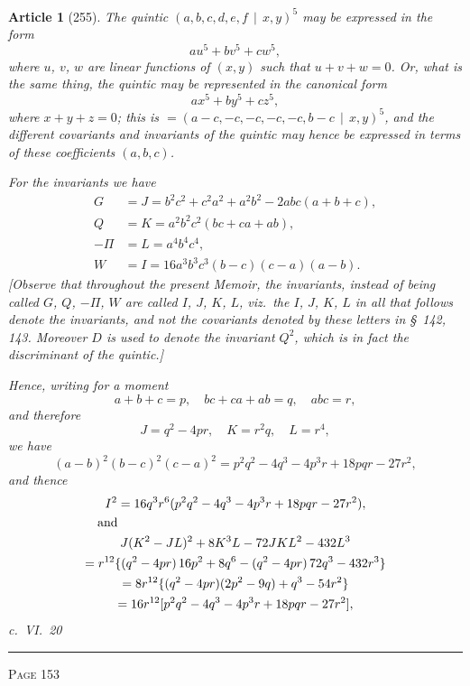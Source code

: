 \documentclass[11pt,a4paper]{article}
\theoremstyle{cayley}
\newtheorem{art}{Article}
\begin{document}
\begin{art}[255]
The quintic $(a, b, c, d, e, f \,\mid\, x, y)^5$ may be expressed in the form
\[
au^5 + bv^5 + cw^5,
\]
where $u$, $v$, $w$ are linear functions of $(x, y)$ such that $u + v + w = 0$. Or, what is the same thing, the quintic may be represented in the canonical form
\[
ax^5 + by^5 + cz^5,
\]
where $x + y + z = 0$; this is $= (a-c, -c, -c, -c, -c, b-c \,\mid\, x, y)^5$, and the different covariants and invariants of the quintic may hence be expressed in terms of these coefficients $(a, b, c)$.

For the invariants we have
\begin{align*}
G &= J = b^2c^2 + c^2a^2 + a^2b^2 - 2abc(a+b+c), \\
Q &= K = a^2b^2c^2(bc + ca + ab), \\
-\Pi &= L = a^4b^4c^4, \\
W &= I = 16a^3b^3c^3(b-c)(c-a)(a-b).
\end{align*}
[Observe that throughout the present Memoir, the invariants, instead of being called $G$, $Q$, $-\Pi$, $W$ are called $I$, $J$, $K$, $L$, viz.\ the $I$, $J$, $K$, $L$ in all that follows denote the invariants, and not the covariants denoted by these letters in \S\ 142, 143. Moreover $D$ is used to denote the invariant $Q^2$, which is in fact the discriminant of the quintic.]

Hence, writing for a moment
\[
a + b + c = p, \quad bc + ca + ab = q, \quad abc = r,
\]
and therefore
\[
J = q^2 - 4pr, \quad K = r^2q, \quad L = r^4,
\]
we have
\[
(a-b)^2(b-c)^2(c-a)^2 = p^2q^2 - 4q^3 - 4p^3r + 18pqr - 27r^2,
\]
and thence
\begin{multline*}
I^2 = 16q^3r^6(p^2q^2 - 4q^3 - 4p^3r + 18pqr - 27r^2), \\
\shoveleft{\text{and}}\\
J(K^2 - JL)^2 + 8K^3L - 72JKL^2 - 432L^3 \\
= r^{12}\{(q^2-4pr)\,16p^2 + 8q^6 - (q^2-4pr)\,72q^3 - 432r^3\} \\
= 8r^{12}\{(q^2-4pr)(2p^2-9q) + q^3 - 54r^2\} \\
= 16r^{12}[p^2q^2 - 4q^3 - 4p^3r + 18pqr - 27r^2],
\end{multline*}
\hspace{\fill}c.~VI.\ 20
\end{art}

\vspace{1em}
\noindent\rule{\textwidth}{0.4pt}
\begin{center}\textsc{Page 153}\end{center}
\newpage
\end{document}
